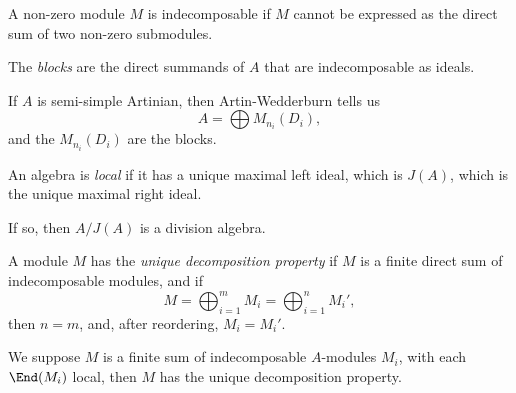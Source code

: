\documentclass[a4paper]{article}
\begin{document}
\begin{defi}[Indecomposable]
  A non-zero module $M$ is indecomposable if $M$ cannot be expressed as the direct sum of two non-zero submodules.
\end{defi}

\begin{defi}[Block]
  The \emph{blocks} are the direct summands of $A$ that are indecomposable as ideals.
\end{defi}

\begin{eg}
  If $A$ is semi-simple Artinian, then Artin-Wedderburn tells us
  \[
    A = \bigoplus M_{n_i}(D_i),
  \]
  and the $M_{n_i}(D_i)$ are the blocks.
\end{eg}

\begin{defi}
  An algebra is \emph{local} if it has a unique maximal left ideal, which is $J(A)$, which is the unique maximal right ideal.
\end{defi}
If so, then $A/J(A)$ is a division algebra.

\begin{defi}
  A module $M$ has the \emph{unique decomposition property} if $M$ is a finite direct sum of indecomposable modules, and if
  \[
    M = \bigoplus_{i = 1}^m M_i = \bigoplus_{i = 1}^n M_i',
  \]
  then $n = m$, and, after reordering, $M_i = M_i'$.
\end{defi}

\begin{thm}
  We suppose $M$ is a finite sum of indecomposable $A$-modules $M_i$, with each $\End(M_i)$ local, then $M$ has the unique decomposition property.
\end{thm}
\end{document}
